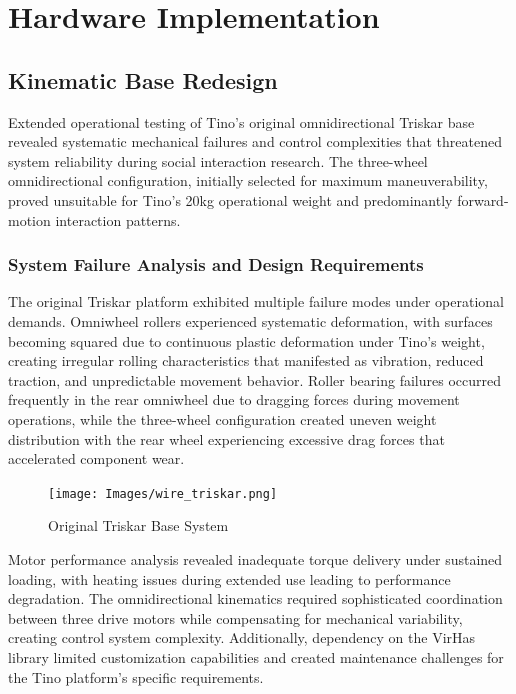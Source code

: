 \section{Hardware Implementation}
\label{sec:hardware_impl}

\subsection{Kinematic Base Redesign}

Extended operational testing of Tino's original omnidirectional Triskar base revealed systematic mechanical failures and control complexities that threatened system reliability during social interaction research. The three-wheel omnidirectional configuration, initially selected for maximum maneuverability, proved unsuitable for Tino's 20kg operational weight and predominantly forward-motion interaction patterns.

\subsubsection{System Failure Analysis and Design Requirements}

The original Triskar platform exhibited multiple failure modes under operational demands. Omniwheel rollers experienced systematic deformation, with surfaces becoming squared due to continuous plastic deformation under Tino's weight, creating irregular rolling characteristics that manifested as vibration, reduced traction, and unpredictable movement behavior. Roller bearing failures occurred frequently in the rear omniwheel due to dragging forces during movement operations, while the three-wheel configuration created uneven weight distribution with the rear wheel experiencing excessive drag forces that accelerated component wear.

\begin{figure}[H]
    \centering
    \texttt{[image: Images/wire\_triskar.png]}
    \caption{Original Triskar Base System}
    \label{fig:original_Triskar_base}
\end{figure}

Motor performance analysis revealed inadequate torque delivery under sustained loading, with heating issues during extended use leading to performance degradation. The omnidirectional kinematics required sophisticated coordination between three drive motors while compensating for mechanical variability, creating control system complexity. Additionally, dependency on the VirHas library limited customization capabilities and created maintenance challenges for the Tino platform's specific requirements.

